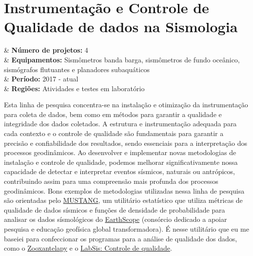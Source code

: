 \documentclass[10pt,a4paper,oneside]{book}
\begin{document}
\section{Instrumentação e Controle de Qualidade de dados na Sismologia}
\label{sec_inst_qc}

\begin{summarybox}[frametitle=\faProjectDiagram{}\quad Panorama da linha de pesquisa]
	\begin{datelist}
		\faFile* & \textbf{Número de projetos:} 4 \\
		\faBinoculars & \textbf{Equipamentos:} Sismômetros banda barga, sismômetros de fundo oceânico, sismógrafos flutuantes e planadores subaquáticos \\
		\faCalendar*[regular] & \textbf{Período:} 2017 - atual \\
		\faMapMarked* & \textbf{Regiões:} Atividades e testes em laboratório \\
	\end{datelist}
\end{summarybox}

\bigskip

Esta linha de pesquisa concentra-se na instalação e otimização da instrumentação para coleta de dados, bem como em métodos para garantir a qualidade e integridade dos dados coletados. A estrutura e instrumentação adequada para cada contexto e o controle de qualidade são fundamentais para garantir a precisão e confiabilidade dos resultados, sendo essenciais para a interpretação dos processos geodinâmicos. Ao desenvolver e implementar novas metodologias de instalação e controle de qualidade, podemos melhorar significativamente nossa capacidade de detectar e interpretar eventos sísmicos, naturais ou antrópicos, contribuindo assim para uma compreensão mais profunda dos processos geodinâmicos. Bons exemplos de metodologias utilizadas nessa linha de pesquisa são orientadas pelo \href{https://services.iris.edu/mustang/}{MUSTANG}, um utilitário estatístico que utiliza métricas de qualidade de dados sísmicos e funções de densidade de probabilidade para analisar os dados sísmológicos do \href{https://www.earthscope.org/}{EarthScope} (consórcio dedicado a apoiar pesquisa e educação geofísica global transformadora). É nesse utilitário que eu me baseiei para confeccionar os programas para a análise de qualidade dos dados, como o \href{https://zooxantelapy.readthedocs.io/}{Zooxantelapy} e o \href{https://github.com/dIOGOLOC/codes_escritos/tree/master/LabSis_controle_de_qualidade}{LabSis: Controle de qualidade}.
\end{document}
